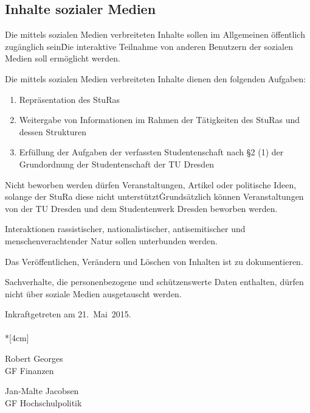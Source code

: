 \begin{multicols}{2}
\section {Inhalte sozialer Medien}
\Abs \Satz Die mittels sozialen Medien verbreiteten Inhalte sollen im Allgemeinen öffentlich zugänglich sein\. Die interaktive Teilnahme von anderen Benutzern der sozialen Medien soll ermöglicht werden.

\Abs \Satz Die mittels sozialen Medien verbreiteten Inhalte dienen den folgenden Aufgaben:
\begin{enumerate}
\item Repräsentation des StuRas
\item Weitergabe von Informationen im Rahmen der Tätigkeiten des StuRas und dessen Strukturen
\item Erfüllung der Aufgaben der verfassten Studentenschaft nach §2 (1) der Grundordnung der Studentenschaft der TU Dresden
\end {enumerate}
\Abs \Satz Nicht beworben werden dürfen Veranstaltungen, Artikel oder politische Ideen, solange der StuRa diese nicht unterstützt\. Grundsätzlich können Veranstaltungen von der TU Dresden und dem Studentenwerk Dresden beworben werden.

\Abs \Satz Interaktionen rassistischer, nationalistischer, antisemitischer und menschenverachtender Natur sollen unterbunden werden. 

\Abs \Satz Das Veröffentlichen, Verändern und Löschen von Inhalten ist zu dokumentieren.

\Abs \Satz Sachverhalte, die personenbezogene und schützenswerte Daten enthalten, dürfen nicht über soziale Medien ausgetauscht werden.

\end{multicols}

\nopagebreak
\vspace{1cm}
Inkraftgetreten am 21.~Mai~2015.
\\



\normalsize
~\\*[4cm]
\begin{center}
\hspace*{\fill}
\parbox{7cm}{Robert Georges\\GF Finanzen}
\hfill\parbox{7cm}{Jan-Malte Jacobsen\\GF Hochschulpolitik}
\hspace*{\fill}
\end{center}

